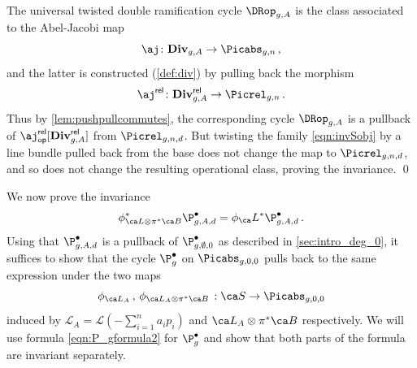 The universal twisted double ramification cycle $\DRop_{g,A}$ is the class associated to the Abel-Jacobi map $$\aj\colon \cat{Div}_{g,A} \to \Picabs_{g,n}\, ,$$
and the latter is constructed (\cref{def:div}) by pulling back the morphism $$\aj^{\rel}\colon \cat{Div}^{\rel}_{g,A} \to \Picrel_{g,n}\, .$$
Thus by \cref{lem:pushpullcommutes}, the corresponding cycle $\DRop_{g,A}$ is a pullback of $\aj^{\rel}_{\mathsf{op}}[\cat{Div}^{\rel}_{g,A}]$ from $\Picrel_{g,n,d}$.
But twisting the family \eqref{eqn:invSobj} by a line bundle pulled back from the base does not change the map to $\Picrel_{g,n,d}$, and so does not change the resulting operational class, proving the invariance.  \qed


We now prove the invariance
$$\phi_{\ca L\otimes \pi^*\ca B}^*\P_{g,A,d}^\bullet=
\phi_\ca L^*\P_{g,A,d}^\bullet  \,  . $$
Using that $\P_{g,A,d}^\bullet$ is a pullback of $\P_{g,\emptyset,0}^\bullet$ as described in \cref{sec:intro_deg_0}, it suffices to show that the cycle $\P_g^\bullet$ on $\Picabs_{g,0,0}$ pulls back to the same expression under the two maps
\[\phi_{\ca L_A}\, , \,
\phi_{\ca L_A \otimes \pi^* \ca B}\,  : \ca S \to \Picabs_{g,0,0}\]
induced by $\mathcal{L}_{A} = \mathcal{L}(-\sum_{i=1}^n a_i p_i)$ and $\ca L_{A} \otimes \pi^* \ca B$ respectively.
 We will  use formula \eqref{eqn:P_gformula2}
 for $\P_g^\bullet$   and show that both parts of the formula are invariant separately.

